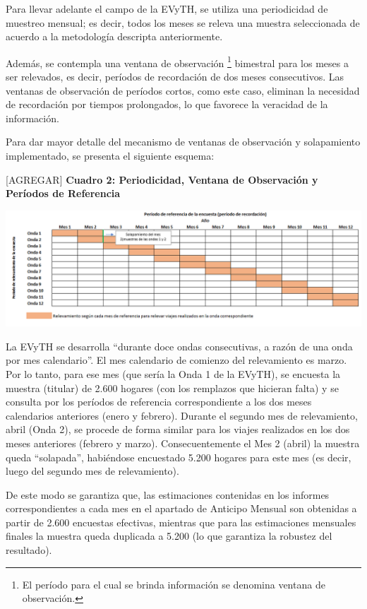 \documentclass[
  openany]{book}
\begin{document}
Para llevar adelante el campo de la EVyTH, se utiliza una periodicidad de muestreo mensual; es decir, todos los meses se releva una muestra seleccionada de acuerdo a la metodología descripta anteriormente.

Además, se contempla una ventana de observación \footnote{El período para el cual se brinda información se denomina ventana de observación.} bimestral para los meses a ser relevados, es decir, períodos de recordación de dos meses consecutivos. Las ventanas de observación de períodos cortos, como este caso, eliminan la necesidad de recordación por tiempos prolongados, lo que favorece la veracidad de la información.

Para dar mayor detalle del mecanismo de ventanas de observación y solapamiento implementado, se presenta el siguiente esquema:

{[}AGREGAR{]} \textbf{Cuadro 2: Periodicidad, Ventana de Observación y Períodos de Referencia}

\includegraphics{cuadros_graficos/03_periodo_de_referencia.png}

La EVyTH se desarrolla ``durante doce ondas consecutivas, a razón de una onda por mes calendario''. El mes calendario de comienzo del relevamiento es marzo. Por lo tanto, para ese mes (que sería la Onda 1 de la EVyTH), se encuesta la muestra (titular) de 2.600 hogares (con los remplazos que hicieran falta) y se consulta por los períodos de referencia correspondiente a los dos meses calendarios anteriores (enero y febrero). Durante el segundo mes de relevamiento, abril (Onda 2), se procede de forma similar para los viajes realizados en los dos meses anteriores (febrero y marzo). Consecuentemente el Mes 2 (abril) la muestra queda ``solapada'', habiéndose encuestado 5.200 hogares para este mes (es decir, luego del segundo mes de relevamiento).

De este modo se garantiza que, las estimaciones contenidas en los informes correspondientes a cada mes en el apartado de Anticipo Mensual son obtenidas a partir de 2.600 encuestas efectivas, mientras que para las estimaciones mensuales finales la muestra queda duplicada a 5.200 (lo que garantiza la robustez del resultado).
\end{document}
